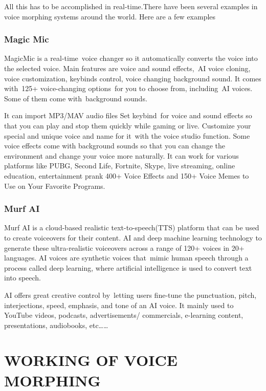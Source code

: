 \documentclass[12pt]{report}
\begin{document}
 All this has to be
accomplished in real-time.There have been several examples in voice morphing systems around the world. Here are a few examples

\subsection{Magic Mic}
MagicMic is a real-time voice changer so it automatically converts the voice into the selected voice. 
Main features are  voice and sound effects, AI voice cloning, voice customization, keybinds control, voice changing background sound.
It comes with 125+ voice-changing options for you to choose from, including AI voices. Some of them come with background sounds.
\newline


It can import MP3/MAV audio files
Set keybind for voice and sound effects so that you can play and stop them quickly while gaming or live.
Customize your special and unique voice and name for it with the voice studio function.
Some voice effects come with background sounds so that you can change the environment and change your voice more naturally.
It can work for various platforms like PUBG, Second Life, Fortnite, Skype, live streaming, online education, entertainment prank
400+ Voice Effects and 150+ Voice Memes to Use on Your Favorite Programs.


\subsection{Murf AI}

Murf AI is a cloud-based realistic text-to-speech(TTS) platform that can be used to create voiceovers for their content.
AI and deep machine learning technology to generate these ultra-realistic voiceovers across a range of 120+ voices in 20+ languages.
AI voices are synthetic voices that mimic human speech through a process called deep learning, where artificial intelligence is used to convert text into speech.
\newline


AI offers great creative control by letting users fine-tune the punctuation, pitch, interjections, speed, emphasis, and tone of an AI voice.
It mainly used to YouTube videos, podcasts, advertisements/ commercials, e-learning content, presentations, audiobooks, etc……


\chapter{WORKING OF VOICE MORPHING}
\end{document}

